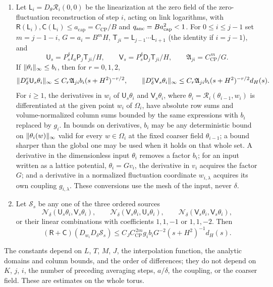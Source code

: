 \begin{lemma}
\begin{enumerate}
\begin{align*}
 (\mathsf R+\mathsf C)(D_\delta^rP_s^\delta\mathsf D_j)&\le C_r(s+H^2)^{-r/2}d_H(s),\\
 (\mathsf R+\mathsf C)(D_\delta^rP_s^\delta I_a\mathsf P_j)&\le C_r(s+H^2)^{-r/2}.
\end{align*}
The cancellation is used for each column with input on the lattice of mesh $H$, before any earlier linearization is composed.
\item Let $\mathsf L_i=D_\theta\mathscr R_i(0,0)$ be the linearization at the zero field of the zero-fluctuation reconstruction of step $i$, acting on link logarithms, with $\mathsf R(\mathsf L_i),\mathsf C(\mathsf L_i)\le a_{\mathrm{cap}}=C_{\mathrm{CP}}/B$ and $q_{\mathrm{anc}}=Ba_{\mathrm{cap}}^2<1$. For $0\le i\le j-1$ set $m=j-1-i$, $G=a_i=B^mH$, $\mathsf T_{ji}=\mathsf L_{j-1}\cdots\mathsf L_{i+1}$ (the identity if $i=j-1$), and
\[
 \mathsf U_s=P_s^\delta I_a\mathsf P_j\mathsf T_{ji}/H,\qquad
 \mathsf V_s=P_s^\delta\mathsf D_j\mathsf T_{ji}/H,\qquad
 \mathfrak A_{ji}=C_{\mathrm{CP}}^{\,m}/G.
\]
If $\lVert \theta_i\rVert_\infty\le b_i$, then for $r=0,1,2$,
\[
 \lVert D_\delta^r\mathsf U_s\theta_i\rVert_\infty\le C_r\mathfrak A_{ji}b_i(s+H^2)^{-r/2},\qquad
 \lVert D_\delta^r\mathsf V_s\theta_i\rVert_\infty\le C_r\mathfrak A_{ji}b_i(s+H^2)^{-r/2}d_H(s).
\]
For $i\ge1$, the derivatives in $w_i$ of $\mathsf U_s\theta_i$ and $\mathsf V_s\theta_i$, where $\theta_i=\mathscr R_i(\theta_{i-1},w_i)$ is differentiated at the given point $w_i$ of $\Omega_i$, have absolute row sums and volume-normalized column sums bounded by the same expressions with $b_i$ replaced by $g_i$. In bounds on derivatives, $b_i$ may be any deterministic bound on $\lVert \theta_i(w)\rVert_\infty$ valid for every $w\in\Omega_i$ at the fixed coarser field $\theta_{i-1}$; a bound sharper than the global one may be used when it holds on that whole set. A derivative in the dimensionless input $\theta_i$ removes a factor $b_i$; for an input written as a lattice potential, $\theta_i=Gv_i$, the derivative in $v_i$ acquires the factor $G$; and a derivative in a normalized fluctuation coordinate $w_{i,\lambda}$ acquires its own coupling $g_{i,\lambda}$. These conversions use the mesh of the input, never $\delta$.
\item Let $\mathscr S_s$ be any one of the three ordered sources
\[
 \mathcal N_\delta(\mathsf U_s\theta_i,\mathsf V_s\theta_i),\qquad
 \mathcal N_\delta(\mathsf V_s\theta_i,\mathsf U_s\theta_i),\qquad
 \mathcal N_\delta(\mathsf V_s\theta_i,\mathsf V_s\theta_i),
\]
or their linear combinations with coefficients $1,1,-1$ or $1,1,-2$. Then
\[
 (\mathsf R+\mathsf C)(D_{w_i}D_\delta\mathscr S_s)\le C_JC_{\mathrm{CP}}^{\,2m}g_ib_iG^{-2}(s+H^2)^{-1}d_H(s).
\]
\end{enumerate}
The constants depend on $L$, $T$, $M$, $J$, the interpolation function, the analytic domains and column bounds, and the order of differences; they do not depend on $K$, $j$, $i$, the number of preceding averaging steps, $a/\delta$, the coupling, or the coarser field. These are estimates on the whole torus.
\end{lemma}

